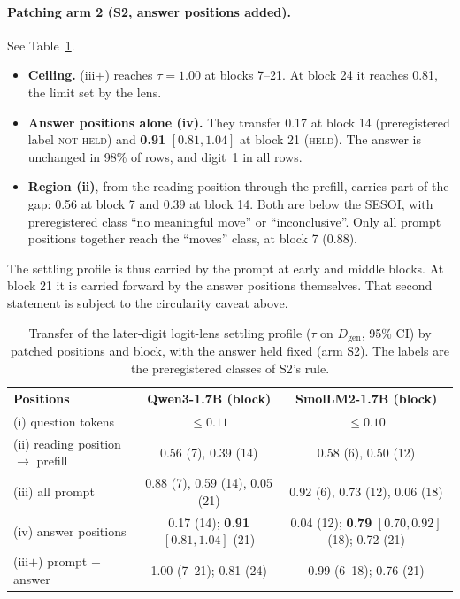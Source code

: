 \documentclass[11pt]{article}
\newcommand{\verdict}[1]{\textsc{\MakeLowercase{#1}}}
\begin{document}
\paragraph{Patching arm 2 (S2, answer positions added).} See Table~\ref{tab:s2}.
\begin{itemize}
\item \textbf{Ceiling.} (iii$+$) reaches $\tau = 1.00$ at blocks 7--21. At block 24 it reaches 0.81, the limit set by the lens.
\item \textbf{Answer positions alone (iv).} They transfer 0.17 at block 14 (preregistered label \verdict{NOT HELD}) and \textbf{0.91} $[0.81, 1.04]$ at block 21 (\verdict{HELD}). The answer is unchanged in 98\% of rows, and digit~1 in all rows.
\item \textbf{Region (ii)}, from the reading position through the prefill, carries part of the gap: 0.56 at block 7 and 0.39 at block 14. Both are below the SESOI, with preregistered class ``no meaningful move'' or ``inconclusive''. Only all prompt positions together reach the ``moves'' class, at block 7 (0.88).
\end{itemize}
The settling profile is thus carried by the prompt at early and middle blocks. At block 21 it is carried forward by the answer positions themselves. That second statement is subject to the circularity caveat above.

\begin{table}[t]
\centering\small
\caption{Transfer of the later-digit logit-lens settling profile ($\tau$ on $D_\text{gen}$, 95\% CI) by patched positions and block, with the answer held fixed (arm S2). The labels are the preregistered classes of S2's rule.}
\label{tab:s2}
\setlength{\tabcolsep}{4pt}\footnotesize
\begin{tabular}{@{}lcc@{}}
\toprule
Positions & Qwen3-1.7B (block) & SmolLM2-1.7B (block) \\
\midrule
(i) question tokens & $\le 0.11$ & $\le 0.10$ \\
(ii) reading position $\to$ prefill & 0.56 (7), 0.39 (14) & 0.58 (6), 0.50 (12) \\
(iii) all prompt & 0.88 (7), 0.59 (14), 0.05 (21) & 0.92 (6), 0.73 (12), 0.06 (18) \\
(iv) answer positions & 0.17 (14); \textbf{0.91} $[0.81, 1.04]$ (21) & 0.04 (12); \textbf{0.79} $[0.70, 0.92]$ (18); 0.72 (21) \\
(iii$+$) prompt $+$ answer & 1.00 (7--21); 0.81 (24) & 0.99 (6--18); 0.76 (21) \\
\bottomrule
\end{tabular}
\end{table}
\end{document}
